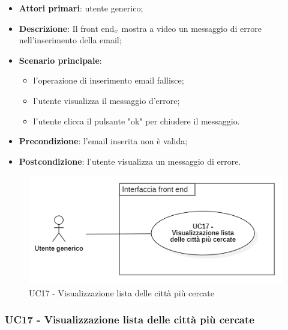 \begin{itemize}
	\item \textbf{Attori primari}: utente generico;
	\item \textbf{Descrizione}: Il front end$_{\scaleto{G}{3pt}}$ mostra a video un messaggio di errore nell'inserimento della email;
	\item \textbf{Scenario principale}: \begin{itemize}
		\item l'operazione di inserimento email fallisce;
		\item l'utente visualizza il messaggio d'errore;
		\item l'utente clicca il pulsante "ok" per chiudere il messaggio.
	\end{itemize}
	\item \textbf{Precondizione}: l'email inserita non è valida;
	\item \textbf{Postcondizione}: l'utente visualizza un messaggio di errore.
\end{itemize}



\begin{center}
	\begin{figure}[H]
		\centering\includegraphics[scale=0.7]{../immagini/attori_casi/uc17.png}
		\caption{UC17 - Visualizzazione lista delle città più cercate}
	\end{figure}
\end{center}


\subsubsection{UC17 - Visualizzazione lista delle città più cercate}\label{CasiDUsoCasiDUsoFacoltativiTraUnUtenteEIlFrontEndElencoCasiDUsoUC17VisualizzazioneListaDelleCittaPiuCercate}


